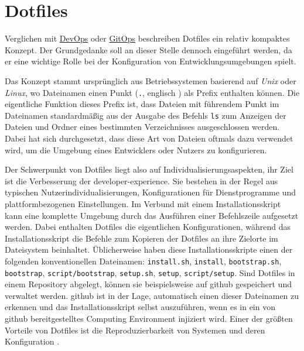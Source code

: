 \section{Dotfiles}
\label{sec:03-04_dotfiles}

Verglichen mit \hyperref[sec:03-01_devops]{DevOps} oder \hyperref[sec:03-03_gitops]{GitOps} beschreiben Dotfiles ein relativ kompaktes Konzept. Der Grundgedanke soll an dieser Stelle dennoch eingeführt werden, da er eine wichtige Rolle bei der Konfiguration von Entwicklungsumgebungen spielt.

Das Konzept stammt ursprünglich aus Betriebssystemen basierend auf \textit{Unix} oder \textit{Linux}, wo Dateinamen einen Punkt (\texttt{.}, englisch ) als Prefix enthalten können. Die eigentliche Funktion dieses Prefix ist, dass Dateien mit führendem Punkt im Dateinamen standardmäßig aus der Ausgabe des Befehls \texttt{ls} zum Anzeigen der Dateien und Ordner eines bestimmten Verzeichnisses ausgeschlossen werden. Dabei hat sich durchgesetzt, dass diese Art von Dateien oftmals dazu verwendet wird, um die Umgebung eines Entwicklers oder Nutzers zu konfigurieren. \cite{029:Connecting-the-Dotfiles}

Der Schwerpunkt von Dotfiles liegt also auf Individualisierungsaspekten, ihr Ziel ist die Verbesserung der \Gls{developer-experience}. Sie bestehen in der Regel aus typischen Nutzerindividualisierungen, Konfigurationen für Dienstprogramme und plattformbezogenen Einstellungen. Im Verbund mit einem Installationsskript kann eine komplette Umgebung durch das Ausführen einer Befehlszeile aufgesetzt werden. Dabei enthalten Dotfiles die eigentlichen Konfigurationen, während das Installationsskript die Befehle zum Kopieren der Dotfiles an ihre Zielorte im Dateisystem beinhaltet. \cite{203:Dev-Environment-as-a-Code-with-DevContainers-Dotfiles-and-GitHub-Codespaces} Üblicherweise haben diese Installationsskripte einen der folgenden konventionellen Dateinamen: \texttt{install.sh}, \texttt{install}, \texttt{bootstrap.sh}, \texttt{bootstrap}, \texttt{script/bootstrap}, \texttt{setup.sh}, \texttt{setup}, \texttt{script/setup}. Sind Dotfiles in einem Repository abgelegt, können sie beispielsweise auf \Gls{github} gespeichert und verwaltet werden. \Gls{github} ist in der Lage, automatisch einen dieser Dateinamen zu erkennen und das Installationsskript selbst auszuführen, wenn es in ein von \Gls{github} bereitgestelltes Computing Environment injiziert wird. \cite{304:Personalizing-GitHub-Codespaces-for-your-Account} Einer der größten Vorteile von Dotfiles ist die Reproduzierbarkeit von Systemen und deren Konfiguration \cite{029:Connecting-the-Dotfiles}.

